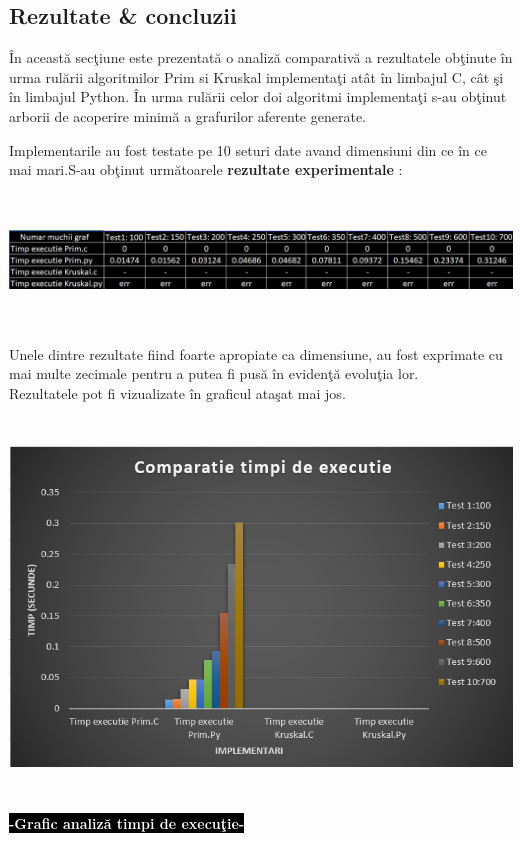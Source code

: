 \documentclass[14pt]{article}
\begin{document}

\subsection{Rezultate \& concluzii}
\vspace{3mm}
\^In aceast\u{a} sec\c tiune este prezentat\u{a} o analiz\u{a} comparativ\u{a} a rezultatele ob\c tinute \^in urma rul\u{a}rii algoritmilor Prim si Kruskal implementa\c ti at\^at \^in limbajul C, c\^at \c si \^in limbajul Python.
\^In urma rul\u{a}rii celor doi algoritmi implementa\c ti s-au ob\c tinut arborii de acoperire minim\u{a} a grafurilor aferente generate.

Implementarile au fost testate pe 10 seturi date avand dimensiuni din ce \^in ce mai mari.S-au ob\c tinut urm\u{a}toarele \textbf{rezultate experimentale} :
\vspace{2mm}
\begin{center}
    \includegraphics[width = 15cm, height = 3.5cm]{tabel}
\end{center}
\vspace{2mm}

Unele dintre rezultate fiind foarte apropiate ca dimensiune, au fost exprimate cu mai multe zecimale pentru a putea fi pus\u{a} \^in eviden\c t\u{a} evolu\c tia lor.\\
\vspace{1mm}
Rezultatele pot fi vizualizate \^in graficul ata\c sat mai jos.
\vspace{2mm}
\begin{center}
    \includegraphics[width = 14cm, height = 10cm]{grafic3.0}
\end{center}
\begin{center}
    \colorbox{black}{\textcolor{white}{\textbf{-Grafic analiz\u{a} timpi de execu\c tie-}}}
\end{center}
\end{document}
